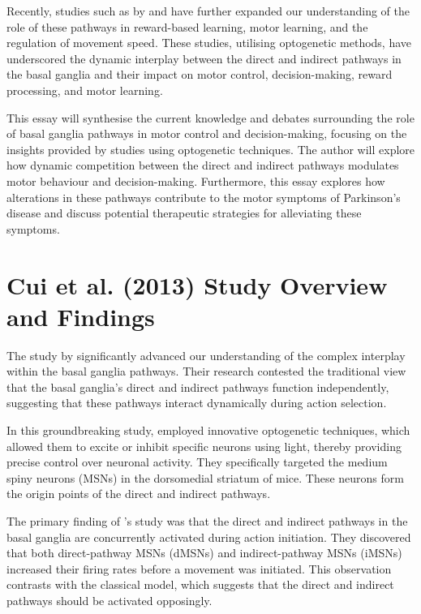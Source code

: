 \documentclass[10pt]{article}
\begin{document}
\begin{sloppypar}
  Recently, studies such as by \cite{hilt_evidence_2016} and \cite{wang_direct_2015} have further expanded our understanding of the role of these pathways in reward-based learning, motor learning, and the regulation of movement speed. These studies, utilising optogenetic methods, have underscored the dynamic interplay between the direct and indirect pathways in the basal ganglia and their impact on motor control, decision-making, reward processing, and motor learning.

  This essay will synthesise the current knowledge and debates surrounding the role of basal ganglia pathways in motor control and decision-making, focusing on the insights provided by studies using optogenetic techniques. The author will explore how dynamic competition between the direct and indirect pathways modulates motor behaviour and decision-making. Furthermore, this essay explores how alterations in these pathways contribute to the motor symptoms of Parkinson’s disease and discuss potential therapeutic strategies for alleviating these symptoms.

  \section{Cui et al. (2013) Study Overview and Findings}
  \label{sec:cui-et-al-2013}

  The study by \cite{cui_concurrent_2013} significantly advanced our understanding of the complex interplay within the basal ganglia pathways. Their research contested the traditional view that the basal ganglia’s direct and indirect pathways function independently, suggesting that these pathways interact dynamically during action selection.

  In this groundbreaking study, \citeauthor{cui_concurrent_2013} employed innovative optogenetic techniques, which allowed them to excite or inhibit specific neurons using light, thereby providing precise control over neuronal activity. They specifically targeted the medium spiny neurons (MSNs) in the dorsomedial striatum of mice. These neurons form the origin points of the direct and indirect pathways.

  The primary finding of \citeauthor{cui_concurrent_2013}’s study was that the direct and indirect pathways in the basal ganglia are concurrently activated during action initiation. They discovered that both direct-pathway MSNs (dMSNs) and indirect-pathway MSNs (iMSNs) increased their firing rates before a movement was initiated. This observation contrasts with the classical model, which suggests that the direct and indirect pathways should be activated opposingly.


\end{sloppypar}
\end{document}

